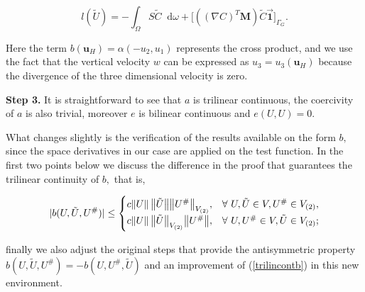 \documentclass[11pt]{article}
\newcommand*\diff{\mathop{}\!\mathrm{d}}
\begin{document}
\[ l(\tilde{U}) = - \int_\Omega S \tilde{C} \diff \omega + \big[((\nabla C)^ T \mathbf{M}) \tilde{C} \vec{\mathbf{1}} \big] _{\Gamma_G}. \]

Here the term $b(\mathbf{u}_H) = \alpha (-u_2, u_1)$ represents the cross product, and we use the fact that the vertical velocity $w$ can be expressed as $u_3 = u_3(\mathbf{u}_H)$ because the divergence of the three dimensional velocity is zero.

\textbf{Step 3.} It is straightforward to see that $a$ is trilinear continuous, the coercivity of $a$ is also trivial, moreover $e$ is bilinear continuous and $e(U,U) = 0$.

What changes slightly is the verification of the results available on the form $b,$ since the space derivatives in our case are applied on the test function. In the first two points below we discuss the difference in the proof that guarantees the trilinear continuity of $b,$ that is,

\begin{equation} \label{trilincontb}
  \lvert b(U, \tilde{U}, U^\# ) \rvert \leq \begin{cases}
    c \norm{U} \big \|\tilde{U}\big \|  \big \| U^\#  \big \|_{V_{(2)}}, & \forall \text{ } U, \tilde{U} \in V, U^\# \in V_{(2)}, \\
    c \norm{U} \big \|\tilde{U}\big \| _{V_{(2)}} \big \| U^\#  \big \|, & \forall \text{ } U, U^\# \in V, \tilde{U}  \in V_{(2)};
  \end{cases}
\end{equation}

finally we also adjust the original steps that provide the antisymmetric property $b(U, \tilde{U}, U^\# ) = - b(U, U^\#, \tilde{U} )$ and an improvement of (\ref{trilincontb}) in this new environment.
\end{document}
